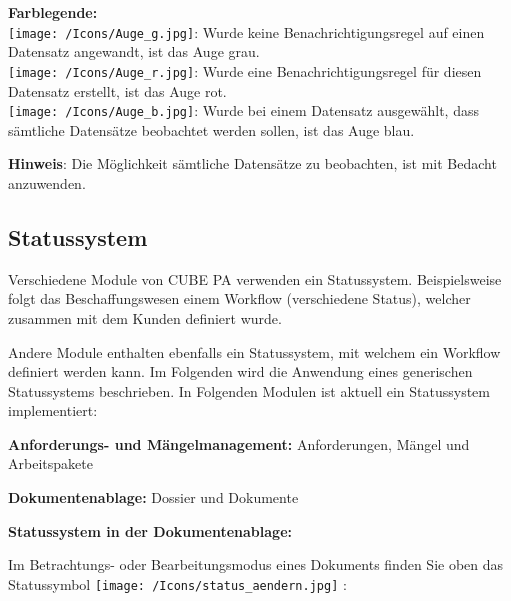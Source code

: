 \textbf{Farblegende:}\\
\texttt{[image: /Icons/Auge\_g.jpg]}: Wurde keine Benachrichtigungsregel auf einen Datensatz angewandt, ist das Auge grau.\\
\texttt{[image: /Icons/Auge\_r.jpg]}: Wurde eine Benachrichtigungsregel für diesen Datensatz erstellt, ist das Auge rot.\\
\texttt{[image: /Icons/Auge\_b.jpg]}: Wurde bei einem Datensatz ausgewählt, dass sämtliche Datensätze beobachtet werden sollen, ist das Auge blau.\\

\vspace{\baselineskip}

\textbf{Hinweis}: Die Möglichkeit sämtliche Datensätze zu beobachten, ist mit Bedacht anzuwenden.

\pagebreak
\subsection{Statussystem} %
\label{bkm:Ref2018073101}

Verschiedene Module von CUBE PA verwenden ein Statussystem. Beispielsweise folgt das Beschaffungswesen einem Workflow (verschiedene Status), welcher zusammen mit dem Kunden definiert wurde.

Andere Module enthalten ebenfalls ein Statussystem, mit welchem ein Workflow definiert werden kann. Im Folgenden wird die Anwendung eines generischen Statussystems beschrieben. In Folgenden Modulen ist aktuell ein Statussystem implementiert:

\vspace{\baselineskip}

\begin{compactitem}
	\item \textbf{Anforderungs- und Mängelmanagement:} Anforderungen, Mängel und Arbeitspakete
	\item \textbf{Dokumentenablage:} Dossier und Dokumente
\end{compactitem}

\vspace{\baselineskip}

\textbf{Statussystem in der Dokumentenablage:}

\vspace{\baselineskip}

Im Betrachtungs- oder Bearbeitungsmodus eines Dokuments finden Sie oben das Statussymbol \texttt{[image: /Icons/status\_aendern.jpg]} : 

